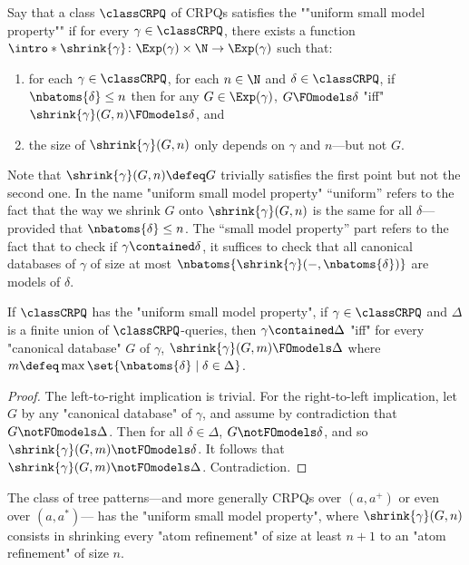 Say that a class $\classCRPQ$ of CRPQs satisfies the \AP""uniform small model property""
if for every $\gamma \in \classCRPQ$, there exists a function
$\intro*\shrink{\gamma}\colon \Exp(\gamma) \times \N \to \Exp(\gamma)$ such that:
\begin{enumerate}
  \item for each $\gamma \in \classCRPQ$, for each $n \in \N$ and $\delta \in \classCRPQ$,
  if $\nbatoms{\delta} \leq n$ then for any $G \in \Exp(\gamma)$, $G \FOmodels \delta$ "iff"
  $\shrink{\gamma}(G, n) \FOmodels \delta$, and
  \item the size of $\shrink{\gamma}(G, n)$ only depends on $\gamma$ and $n$---but not $G$.
\end{enumerate} 
Note that $\shrink{\gamma}(G, n) \defeq G$ trivially satisfies the first point but not the second one.
In the name "uniform small model property" ``uniform'' refers to the fact
that the way we shrink $G$ onto $\shrink{\gamma}(G,n)$ is the same for all $\delta$---provided that $\nbatoms{\delta} \leq n$. The ``small model property'' part refers to the fact that to check if
$\gamma \contained \delta$, it suffices to check that all canonical databases of $\gamma$
of size at most $\nbatoms{\shrink{\gamma}(-, \nbatoms{\delta})}$ are models of $\delta$.

\begin{proposition}
  \AP\label{prop:containment-uniform-smp}
  If $\classCRPQ$ has the "uniform small model property", if $\gamma \in \classCRPQ$ and $\Delta$ 
  is a finite union of $\classCRPQ$-queries, then
  $\gamma \contained \Delta$ "iff" for every "canonical database" $G$ of $\gamma$,
  $\shrink{\gamma}(G, m) \FOmodels \Delta$
  where $m \defeq \max{\set{\nbatoms{\delta} \mid \delta \in \Delta}}$.
\end{proposition}

\begin{proof}
  The left-to-right implication is trivial. For the right-to-left implication, 
  let $G$ by any "canonical database" of $\gamma$,
  and assume by contradiction that $G \notFOmodels \Delta$.
  Then for all $\delta \in \Delta$, $G \notFOmodels \delta$,
  and so $\shrink{\gamma}(G, m) \notFOmodels \delta$.
  It follows that $\shrink{\gamma}(G, m) \notFOmodels \Delta$.
  Contradiction.
\end{proof}

\begin{proposition}
  \AP\label{prop:tree-patterns-uniform-smp}
  The class of tree patterns---and more generally CRPQs over $(a, a^+)$ or even over $(a, a^*)$---
  has the "uniform small model property", where $\shrink{\gamma}(G, n)$ consists
  in shrinking every "atom refinement" of size at least $n+1$ to an "atom refinement" of
  size $n$.
\end{proposition}

